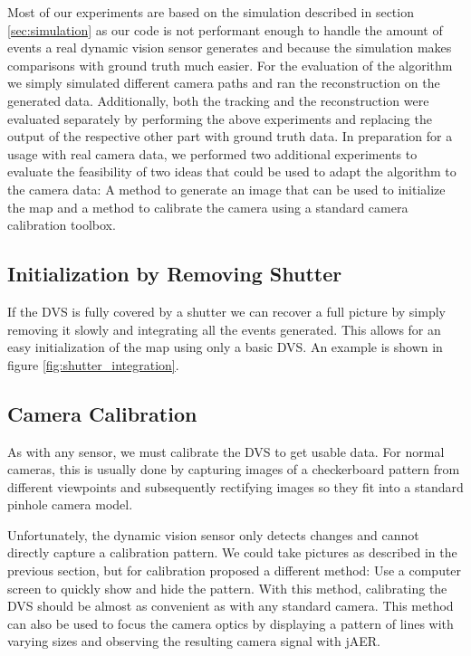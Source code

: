Most of our experiments are based on the simulation described in section
\ref{sec:simulation} as our code is not performant enough to handle the amount
of events a real dynamic vision sensor generates and because the simulation
makes comparisons with ground truth much easier.
For the evaluation of the algorithm we simply simulated different camera paths
and ran the reconstruction on the generated data.
Additionally, both the tracking and the reconstruction were evaluated separately
by performing the above experiments and replacing the output of the respective
other part with ground truth data.
In preparation for a usage with real camera data, we performed two additional
experiments to evaluate the feasibility of two ideas that could be used to adapt
the algorithm to the camera data:
A method to generate an image that can be used to initialize the map and a method
to calibrate the camera using a standard camera calibration toolbox.

\subsection{Initialization by Removing Shutter}
\label{sec:shutter_removal}

If the DVS is fully covered by a shutter we can recover a full picture by
simply removing it slowly and integrating all the events generated. This allows
for an easy initialization of the map using only a basic DVS. An example is shown in figure \ref{fig:shutter_integration}.

\subsection{Camera Calibration}
\label{sec:camera_calibration}

As with any sensor, we must calibrate the DVS to get usable data. For normal
cameras, this is usually done by capturing images of a checkerboard pattern from
different viewpoints and subsequently rectifying images so they fit into a
standard pinhole camera model.

Unfortunately, the dynamic vision sensor only detects changes and cannot
directly capture a calibration pattern. We could take pictures as described in
the previous section, but for calibration \cite{mueggler2014event} proposed a different method:
Use a computer screen to quickly show and hide the pattern. With this method,
calibrating the DVS should be almost as convenient as with any standard camera.
This method can also be used to focus the camera optics by displaying a pattern
of lines with varying sizes and observing the resulting camera signal with jAER.
